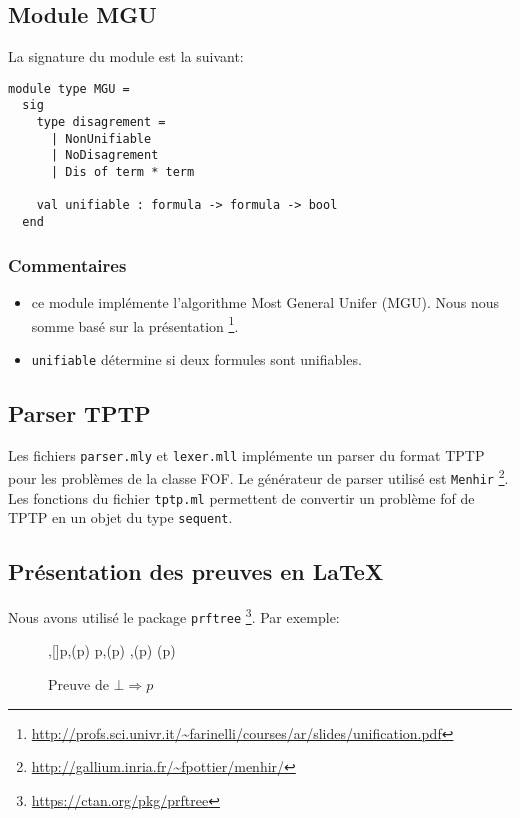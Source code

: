 \documentclass[12pt]{article}
\begin{document}
\subsection{Module MGU}
La signature du module est la suivant:
\begin{lstlisting}[basicstyle=\small]
module type MGU =
  sig
    type disagrement =
      | NonUnifiable
      | NoDisagrement
      | Dis of term * term

    val unifiable : formula -> formula -> bool
  end

\end{lstlisting}

\subsubsection*{Commentaires}
\begin{itemize}
\item ce module implémente l'algorithme Most General Unifer (MGU). Nous nous somme basé sur la présentation \footnote{\url{http://profs.sci.univr.it/~farinelli/courses/ar/slides/unification.pdf}}.
\item \verb?unifiable? détermine si deux formules sont unifiables.
\end{itemize}


\subsection{Parser TPTP}
Les fichiers \verb?parser.mly? et \verb?lexer.mll? implémente un parser du format TPTP pour les problèmes de la classe FOF. Le générateur de parser utilisé est \verb?Menhir? \footnote{\url{http://gallium.inria.fr/~fpottier/menhir/}}. Les fonctions du fichier \verb?tptp.ml? permettent de convertir un problème fof de TPTP en un objet du type \verb?sequent?.

\subsection{Présentation des preuves en LaTeX}
Nous avons utilisé le package \verb?prftree? \footnote{\url{https://ctan.org/pkg/prftree}}.
Par exemple:
\begin{figure}[H]
  \hspace*{2cm}
  \centering
{}
{
{
{
{\bot ,[\bot ]\vdash p,(\bot \Rightarrow p)}}
{\bot \vdash p,(\bot \Rightarrow p)}}
{,(\bot \Rightarrow p)}}
{\vdash (\bot \Rightarrow p)}%
  \caption{\label{fig:label} Preuve de $\bot \Rightarrow p$}
\end{figure}
\end{document}
